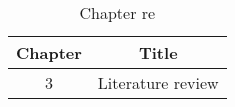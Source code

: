 \begin{table}[h!]
\centering
\begin{tabular}{cc}
{Chapter} & {Title} \\ \midrule
{3} & {Literature review} \\
\end{tabular}
\caption{Chapter re}
\label{table:1}
\end{table}